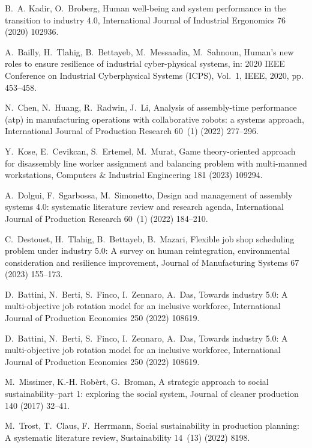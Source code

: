 \documentclass[review,12pt, 3p, times]{elsarticle}
\begin{document}
\begin{thebibliography}{00}
B.~A. Kadir, O.~Broberg, Human well-being and system performance in the
  transition to industry 4.0, International Journal of Industrial Ergonomics 76
  (2020) 102936.

A.~Bailly, H.~Tlahig, B.~Bettayeb, M.~Messaadia, M.~Sahnoun, Human’s new
  roles to ensure resilience of industrial cyber-physical systems, in: 2020
  IEEE Conference on Industrial Cyberphysical Systems (ICPS), Vol.~1, IEEE,
  2020, pp. 453--458.

N.~Chen, N.~Huang, R.~Radwin, J.~Li, Analysis of assembly-time performance
  (atp) in manufacturing operations with collaborative robots: a systems
  approach, International Journal of Production Research 60~(1) (2022)
  277--296.

Y.~Kose, E.~Cevikcan, S.~Ertemel, M.~Murat, Game theory-oriented approach for
  disassembly line worker assignment and balancing problem with multi-manned
  workstations, Computers \& Industrial Engineering 181 (2023) 109294.

A.~Dolgui, F.~Sgarbossa, M.~Simonetto, Design and management of assembly
  systems 4.0: systematic literature review and research agenda, International
  Journal of Production Research 60~(1) (2022) 184--210.

C.~Destouet, H.~Tlahig, B.~Bettayeb, B.~Mazari, Flexible job shop scheduling
  problem under industry 5.0: A survey on human reintegration, environmental
  consideration and resilience improvement, Journal of Manufacturing Systems 67
  (2023) 155--173.

D.~Battini, N.~Berti, S.~Finco, I.~Zennaro, A.~Das, {Towards industry 5.0: A
  multi-objective job rotation model for an inclusive workforce}, International
  Journal of Production Economics 250 (2022) 108619.

D.~Battini, N.~Berti, S.~Finco, I.~Zennaro, A.~Das, Towards industry 5.0: A
  multi-objective job rotation model for an inclusive workforce, International
  Journal of Production Economics 250 (2022) 108619.

M.~Missimer, K.-H. Rob{\`e}rt, G.~Broman, A strategic approach to social
  sustainability--part 1: exploring the social system, Journal of cleaner
  production 140 (2017) 32--41.

M.~Trost, T.~Claus, F.~Herrmann, Social sustainability in production planning:
  A systematic literature review, Sustainability 14~(13) (2022) 8198.


\end{thebibliography}
\end{document}
